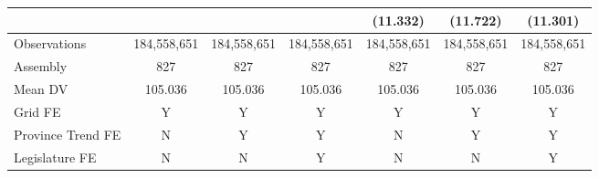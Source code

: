 {\begin{tabular}{l*{6}{c}}
            &                     &                     &                     &    (11.332)         &    (11.722)         &    (11.301)         \\
\hline
Observations& 184,558,651         & 184,558,651         & 184,558,651         & 184,558,651         & 184,558,651         & 184,558,651         \\
Assembly    &         827         &         827         &         827         &         827         &         827         &         827         \\
Mean DV     &     105.036         &     105.036         &     105.036         &     105.036         &     105.036         &     105.036         \\
Grid FE     &           Y         &           Y         &           Y         &           Y         &           Y         &           Y         \\
Province Trend FE&           N         &           Y         &           Y         &           N         &           Y         &           Y         \\
Legislature FE&           N         &           N         &           Y         &           N         &           N         &           Y         \\
\hline
\end{tabular}
}
